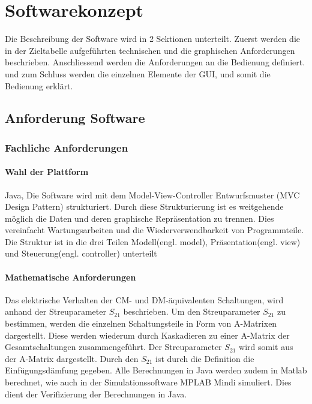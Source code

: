 \section{Softwarekonzept} \label{sec:softwarekonzept}

Die Beschreibung der Software wird in 2 Sektionen unterteilt. Zuerst werden die in der Zieltabelle aufgeführten technischen und die graphischen Anforderungen beschrieben.  Anschliessend werden die Anforderungen an die Bedienung definiert. und zum Schluss werden die einzelnen Elemente der GUI, und somit die Bedienung erklärt.

\subsection{Anforderung Software} \label{subsec:anforderungSoftware}


\subsubsection{Fachliche Anforderungen} \label{subsubsec:fachlicheanforderungen}

\bigskip
{}
\paragraph{Wahl der Plattform} \label{para:wahlderplattform}
Java, Die Software wird mit dem Model-View-Controller Entwurfsmuster (MVC Design Pattern) \cite{MVCDesignPattern} strukturiert. Durch diese Strukturierung ist es weitgehende möglich die Daten und deren graphische Repräsentation zu trennen. Dies vereinfacht Wartungsarbeiten und die Wiederverwendbarkeit von Programmteile. Die Struktur ist in die drei Teilen Modell(engl. model), Präsentation(engl. view) und Steuerung(engl. 		controller) unterteilt

\bigskip
\paragraph{Mathematische Anforderungen}\label{para:mathematischeanforderungen}
Das elektrische Verhalten der CM- und DM-äquivalenten Schaltungen, wird anhand der Streuparameter $S_{21}$ beschrieben. Um den Streuparameter $S_{21}$ zu bestimmen, werden die einzelnen Schaltungsteile in Form von A-Matrixen dargestellt. Diese werden wiederum durch Kaskadieren zu einer A-Matrix der Gesamtschaltungen  zusammengeführt. Der Streuparameter $S_{21}$ wird somit aus der A-Matrix dargestellt. Durch den $S_{21}$ ist durch die Definition die Einfügungsdämfung gegeben. Alle Berechnungen in Java werden zudem in Matlab berechnet, wie auch in der Simulationssoftware MPLAB Mindi simuliert. Dies dient der Verifizierung der Berechnungen in Java.
\bigskip
